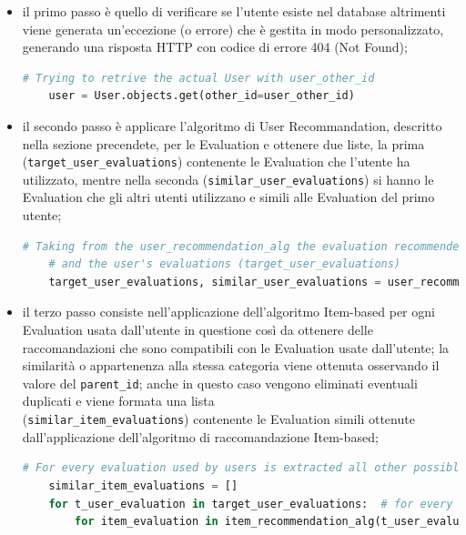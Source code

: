 \begin{itemize}
    \item il primo passo è quello di verificare se l'utente esiste nel database altrimenti viene generata un’eccezione (o errore) che è gestita in 
    modo personalizzato, generando una risposta HTTP con codice di errore 404 (Not Found);
    \begin{lstlisting}[language=Python, label=lst:CF_Hybrid_Evaluation_2]
    # Trying to retrive the actual User with user_other_id
    user = User.objects.get(other_id=user_other_id)
    \end{lstlisting} 
    \item il secondo passo è applicare l'algoritmo di User Recommandation, descritto nella sezione precendete, per le Evaluation e ottenere due liste, 
    la prima (\texttt{target\_user\_evaluations}) contenente le Evaluation che l'utente ha utilizzato, mentre nella seconda (\texttt{similar\_user\_evaluations}) 
    si hanno le Evaluation che gli altri utenti utilizzano e simili alle Evaluation del primo utente;
    \begin{lstlisting}[language=Python, label=lst:CF_Hybrid_Evaluation_3]
    # Taking from the user_recommendation_alg the evaluation recommended from this approach (similar_user_evaluations)
    # and the user's evaluations (target_user_evaluations)
    target_user_evaluations, similar_user_evaluations = user_recommendation_alg(user_other_id)
    \end{lstlisting} 
    \item il terzo passo consiste nell'applicazione dell'algoritmo Item-based per ogni Evaluation usata dall'utente in questione così da ottenere 
    delle raccomandazioni che sono compatibili con le Evaluation usate dall'utente; la similarità o appartenenza alla stessa categoria viene 
    ottenuta osservando il valore del \texttt{parent\_id}; anche in questo caso vengono eliminati eventuali duplicati e viene formata una lista \\
    (\texttt{similar\_item\_evaluations}) contenente le Evaluation simili ottenute dall'applicazione dell'algoritmo di raccomandazione Item-based;
    \begin{lstlisting}[language=Python, label=lst:CF_Hybrid_Evaluation_4]
    # For every evaluation used by users is extracted all other possible evaluations that have the same 'parent_id'
    similar_item_evaluations = []
    for t_user_evaluation in target_user_evaluations:  # for every target user's evaluations
        for item_evaluation in item_recommendation_alg(t_user_evaluation['other_id']):  # is applied the item_recommendation algorithm

\end{lstlisting}
\end{itemize}
